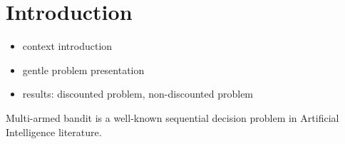 \chapter{Introduction}
\label{chapter:introduction}

\begin{itemize}
    \item context introduction
    \item gentle problem presentation
    \item results: discounted problem, non-discounted problem
\end{itemize}

Multi-armed bandit is a well-known sequential decision problem in Artificial Intelligence literature.

%
